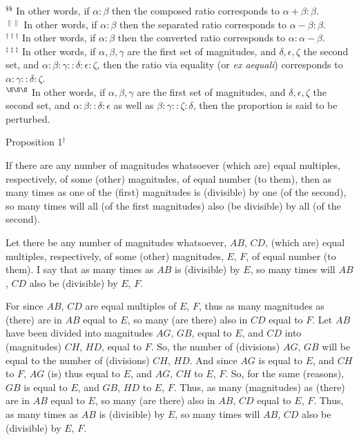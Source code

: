 {$^{\$\$}$ In other words, if
 $\alpha:\beta$ then the composed ratio
 corresponds to  $\alpha+\beta:\beta$.\\[0.5ex]
 $^{\|\|}$ In other words, if
 $\alpha:\beta$ then the separated ratio
 corresponds to  $\alpha-\beta:\beta$.\\[0.5ex]
 $^{\dag\dag\dag}$ In other words, if
 $\alpha:\beta$ then the converted ratio
 corresponds to  $\alpha:\alpha-\beta$.\\[0.5ex]
 $^{\ddag\ddag\ddag}$ In other words, if $\alpha, \beta, \gamma$ are the first set of
 magnitudes, and $\delta, \epsilon, \zeta$ the second set, and $\alpha:
 \beta:\gamma::\delta:\epsilon:\zeta$,  then
 the ratio via equality (or {\em ex aequali}) corresponds to
 $\alpha:\gamma::\delta:\zeta$.\\[0.5ex]
 $^{\S\S\S}$ In other words, if $\alpha, \beta, \gamma$ are the first set of
 magnitudes, and $\delta, \epsilon, \zeta$ the second set, and $\alpha:\beta::\delta:\epsilon$ as well as $\beta:\gamma::\zeta:\delta$, then
 the proportion is said to be perturbed.}


\begin{center}
{\large Proposition 1}$^\dag$
\end{center}

If there are any number of magnitudes whatsoever (which are)  equal multiples, respectively, of
some (other) magnitudes,  of equal number (to them), then as many times as one of the (first) magnitudes is (divisible) by one (of the second), so many times
will all (of the first magnitudes) also (be divisible) by all (of the second).

\epsfysize=0.6in
\centerline{}

Let there be any number of magnitudes whatsoever, $AB$, $CD$, (which are) equal multiples,
respectively, of some (other) magnitudes, $E$, $F$,  of equal  number
(to them). I say that as many times as $AB$ is (divisible) by $E$, so many times will
$AB$, $CD$ also be (divisible) by $E$, $F$.

For since $AB$, $CD$ are equal multiples of $E$, $F$, thus as many
magnitudes as (there) are in  $AB$ equal to $E$, so many (are there) also in $CD$ equal to $F$. Let $AB$ have been divided into magnitudes $AG$, $GB$, equal to $E$,
and $CD$ into (magnitudes) $CH$, $HD$, equal to $F$. So, the number of (divisions)
$AG$, $GB$ will be equal to the number of (divisions) $CH$, $HD$. And since
$AG$ is equal to $E$, and $CH$ to $F$,   $AG$ (is)  thus equal to $E$, and $AG$, $CH$ to
$E$, $F$. So, for the same (reasons), $GB$ is equal to $E$, and $GB$, $HD$ to $E$, $F$.
Thus, as many (magnitudes) as (there) are in $AB$ equal to $E$, so many (are there)
also in $AB$, $CD$ equal to $E$, $F$. Thus, as many times as $AB$ is (divisible) by $E$, so many
times will $AB$, $CD$ also be (divisible)  by $E$, $F$.

